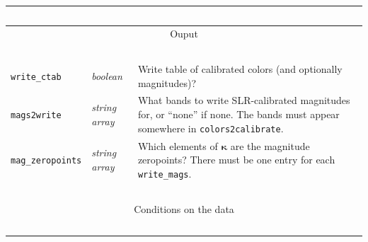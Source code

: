 \documentclass{report}
\newcommand{\zptcolor}{\boldsymbol{\kappa}}
\newcommand{\slr}{SLR}
\begin{document}
\begin{center}
\begin{longtable}{llp{2in}}
~ & ~ & ~ \\ \hline
\multicolumn{3}{c}{Ouput} \\
\hline ~ & ~ & ~ \\ 

\verb|write_ctab| & {\it boolean} & Write table of calibrated colors (and optionally magnitudes)? \\
\verb|mags2write| & {\it string array} & What bands to write \slr-calibrated magnitudes for, or ``none'' if none. The bands must appear somewhere in \verb|colors2calibrate|. \\
\verb|mag_zeropoints| & {\it string array} & Which elements of $\zptcolor$ are the magnitude zeropoints?  There must be one entry for each \verb|write_mags|.  \\

~ & ~ & ~ \\ \hline
\multicolumn{3}{c}{Conditions on the data} \\
\hline ~ & ~ & ~ \\ 


\end{longtable}
\end{center}
\end{document}
